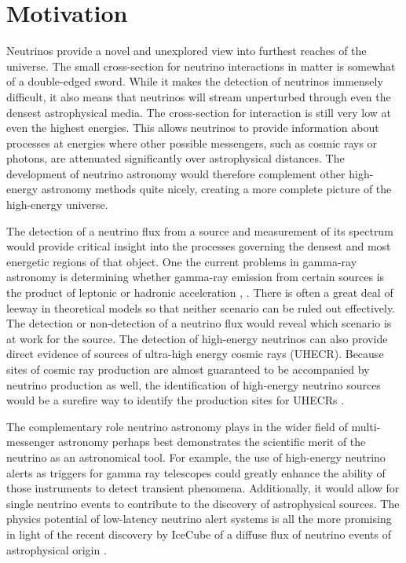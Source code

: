 \documentclass{gatech-thesis}
\begin{document}
\section{Motivation}
Neutrinos provide a novel and unexplored view into furthest reaches of the universe. The small cross-section for neutrino interactions in matter is somewhat of a double-edged sword. While it makes the detection of neutrinos immensely difficult, it also means that neutrinos will stream unperturbed through even the densest astrophysical media. The cross-section for interaction is still very low at even the highest energies. This allows neutrinos to provide information about processes at energies where other possible messengers, such as cosmic rays or photons, are attenuated significantly over astrophysical distances. The development of neutrino astronomy would therefore complement other high-energy astronomy methods quite nicely, creating a more complete picture of the high-energy universe.

The detection of a neutrino flux from a source and measurement of its spectrum would provide critical insight into the processes governing the densest and most energetic regions of that object. One the current problems in gamma-ray astronomy is determining whether gamma-ray emission from certain sources is the product of leptonic or hadronic acceleration \cite{2013ApJ...768...54B}, \cite{2008A&A...492..695B}. There is often a great deal of leeway in theoretical models so that neither scenario can be ruled out effectively. The detection or non-detection of a neutrino flux would reveal which scenario is at work for the source. The detection of high-energy neutrinos can also provide direct evidence of sources of ultra-high energy cosmic rays (UHECR). Because sites of cosmic ray production are almost guaranteed to be accompanied by neutrino production as well, the identification of high-energy neutrino sources would be a surefire way to identify the production sites for UHECRs \cite{1984ARA&A..22..425H}.

The complementary role neutrino astronomy plays in the wider field of multi-messenger astronomy perhaps best demonstrates the scientific merit of the neutrino as an astronomical tool. For example, the use of high-energy neutrino alerts as triggers for gamma ray telescopes could greatly enhance the ability of those instruments to detect transient phenomena. Additionally, it would allow for single neutrino events to contribute to the discovery of astrophysical sources. The physics potential of low-latency neutrino alert systems is all the more promising in light of the recent discovery by IceCube of a diffuse flux of neutrino events of astrophysical origin \cite{2013Sci...342E...1I}.
\end{document}

